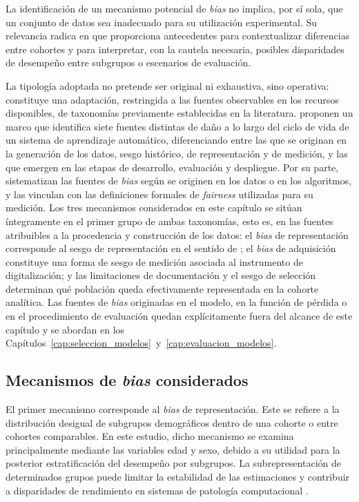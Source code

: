 La identificación de un mecanismo potencial de \textit{bias} no implica, por sí sola, que un conjunto de datos sea inadecuado para su utilización experimental. Su relevancia radica en que proporciona antecedentes para contextualizar diferencias entre cohortes y para interpretar, con la cautela necesaria, posibles disparidades de desempeño entre subgrupos o escenarios de evaluación.

La tipología adoptada no pretende ser original ni exhaustiva, sino operativa: constituye una adaptación, restringida a las fuentes observables en los recursos disponibles, de taxonomías previamente establecidas en la literatura. \textcite{suresh2021framework} proponen un marco que identifica siete fuentes distintas de daño a lo largo del ciclo de vida de un sistema de aprendizaje automático, diferenciando entre las que se originan en la generación de los datos, sesgo histórico, de representación y de medición, y las que emergen en las etapas de desarrollo, evaluación y despliegue. Por su parte, \textcite{mehrabi2021survey} sistematizan las fuentes de \textit{bias} según se originen en los datos o en los algoritmos, y las vinculan con las definiciones formales de \textit{fairness} utilizadas para su medición. Los tres mecanismos considerados en este capítulo se sitúan íntegramente en el primer grupo de ambas taxonomías, esto es, en las fuentes atribuibles a la procedencia y construcción de los datos: el \textit{bias} de representación corresponde al sesgo de representación en el sentido de \textcite{suresh2021framework}; el \textit{bias} de adquisición constituye una forma de sesgo de medición asociada al instrumento de digitalización; y las limitaciones de documentación y el sesgo de selección determinan qué población queda efectivamente representada en la cohorte analítica. Las fuentes de \textit{bias} originadas en el modelo, en la función de pérdida o en el procedimiento de evaluación quedan explícitamente fuera del alcance de este capítulo y se abordan en los Capítulos~\ref{cap:seleccion_modelos}~y~\ref{cap:evaluacion_modelos}.

\subsection{Mecanismos de \textit{bias} considerados}

El primer mecanismo corresponde al \textit{bias} de representación. Este se refiere a la distribución desigual de subgrupos demográficos dentro de una cohorte o entre cohortes comparables. En este estudio, dicho mecanismo se examina principalmente mediante las variables edad y sexo, debido a su utilidad para la posterior estratificación del desempeño por subgrupos. La subrepresentación de determinados grupos puede limitar la estabilidad de las estimaciones y contribuir a disparidades de rendimiento en sistemas de patología computacional \parencite{vaidya2024demographic}.

